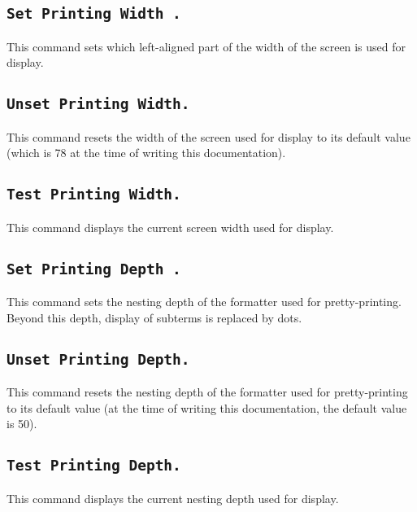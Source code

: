 \subsection[\tt Set Printing Width {\integer}.]{\tt Set Printing Width {\integer}.}
This command sets which left-aligned part of the width of the screen
is used for display. 

\subsection[\tt Unset Printing Width.]{\tt Unset Printing Width.}
This command resets the width of the screen used for display to its
default value (which is 78 at the time of writing this documentation).

\subsection[\tt Test Printing Width.]{\tt Test Printing Width.}
This command displays the current screen width used for display.

\subsection[\tt Set Printing Depth {\integer}.]{\tt Set Printing Depth {\integer}.}
This command sets the nesting depth of the formatter used for
pretty-printing. Beyond this depth, display of subterms is replaced by
dots. 

\subsection[\tt Unset Printing Depth.]{\tt Unset Printing Depth.}
This command resets the nesting depth of the formatter used for
pretty-printing to its default value (at the
time of writing this documentation, the default value is 50).

\subsection[\tt Test Printing Depth.]{\tt Test Printing Depth.}
This command displays the current nesting depth used for display.


